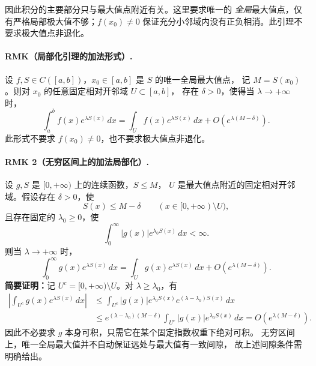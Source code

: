 \documentclass[11pt,a4paper]{ctexart}
\begin{document}
因此积分的主要部分只与最大值点附近有关。这里要求唯一的
\emph{全局}最大值点，仅有严格局部极大值不够；$f(x_0)\ne0$
保证充分小邻域内没有正负相消。此引理不要求极大值点非退化。

\paragraph{RMK（局部化引理的加法形式）.}
设 $f,S\in C([a,b])$，$x_0\in[a,b]$ 是 $S$ 的唯一全局最大值点，
记 $M=S(x_0)$。则对 $x_0$ 的任意固定相对开邻域 $U\subset[a,b]$，
存在 $\delta>0$，使得当 $\lambda\to+\infty$ 时，
\[
 \boxed{
 \int_a^b f(x)e^{\lambda S(x)}\,dx
 =\int_U f(x)e^{\lambda S(x)}\,dx
 +O\!\left(e^{\lambda(M-\delta)}\right).
 }
\]
此形式不要求 $f(x_0)\ne0$，也不要求极大值点非退化。

\paragraph{RMK 2（无穷区间上的加法局部化）.}
设 $g,S$ 是 $[0,+\infty)$ 上的连续函数，$S\le M$，
$U$ 是最大值点附近的固定相对开邻域。假设存在 $\delta>0$，使
\[
 S(x)\le M-\delta\qquad(x\in[0,+\infty)\setminus U),
\]
且存在固定的 $\lambda_0\ge0$，使
\[
 \int_0^\infty |g(x)|e^{\lambda_0S(x)}\,dx<\infty.
\]
则当 $\lambda\to+\infty$ 时，
\[
 \int_0^\infty g(x)e^{\lambda S(x)}\,dx
 =\int_U g(x)e^{\lambda S(x)}\,dx
 +O\!\left(e^{\lambda(M-\delta)}\right).
\]
\textbf{简要证明：}记 $U^c=[0,+\infty)\setminus U$。对
$\lambda\ge\lambda_0$，有
\begin{align*}
 \left|\int_{U^c}g(x)e^{\lambda S(x)}\,dx\right|
 &\le\int_{U^c}|g(x)|e^{\lambda_0S(x)}
                 e^{(\lambda-\lambda_0)S(x)}\,dx\\
 &\le e^{(\lambda-\lambda_0)(M-\delta)}
       \int_{U^c}|g(x)|e^{\lambda_0S(x)}\,dx
 =O\!\left(e^{\lambda(M-\delta)}\right).
\end{align*}
因此不必要求 $g$ 本身可积，只需它在某个固定指数权重下绝对可积。
无穷区间上，唯一全局最大值并不自动保证远处与最大值有一致间隙，
故上述间隙条件需明确给出。
\end{document}
